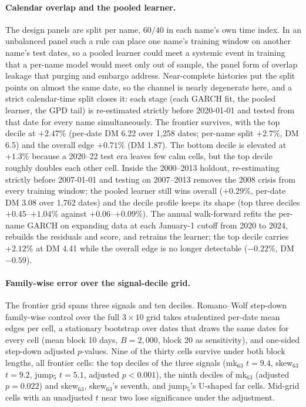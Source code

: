 \documentclass[11pt]{article}
\begin{document}
\paragraph{Calendar overlap and the pooled learner.} The design panels are split per name, $60/40$ in each name's own time index. In an unbalanced panel such a rule can place one name's training window on another name's test dates, so a pooled learner could meet a systemic event in training that a per-name model would meet only out of sample, the panel form of overlap leakage that purging and embargo address. Near-complete histories put the split points on almost the same date, so the channel is nearly degenerate here, and a strict calendar-time split closes it: each stage (each GARCH fit, the pooled learner, the GPD tail) is re-estimated strictly before 2020-01-01 and tested from that date for every name simultaneously. The frontier survives, with the top decile at $+2.47\%$ (per-date DM 6.22 over 1{,}258 dates; per-name split $+2.7\%$, DM 6.5) and the overall edge $+0.71\%$ (DM 1.87). The bottom decile is elevated at $+1.3\%$ because a 2020--22 test era leaves few calm cells, but the top decile roughly doubles each other cell. Inside the 2000--2013 holdout, re-estimating strictly before 2007-01-01 and testing on 2007--2013 removes the 2008 crisis from every training window; the pooled learner still wins overall ($+0.29\%$, per-date DM 3.08 over 1{,}762 dates) and the decile profile keeps its shape (top three deciles $+0.45$--$+1.04\%$ against $+0.06$--$+0.09\%$). The annual walk-forward refits the per-name GARCH on expanding data at each January-1 cutoff from 2020 to 2024, rebuilds the residuals and score, and retrains the learner; the top decile carries $+2.12\%$ at DM 4.41 while the overall edge is no longer detectable ($-0.22\%$, DM $-0.59$).

\paragraph{Family-wise error over the signal-decile grid.} The frontier grid spans three signals and ten deciles. Romano--Wolf step-down family-wise control over the full $3\times10$ grid takes studentized per-date mean edges per cell, a stationary bootstrap over dates that draws the same dates for every cell (mean block 10 days, $B=2{,}000$, block 20 as sensitivity), and one-sided step-down adjusted $p$-values. Nine of the thirty cells survive under both block lengths, all frontier cells: the top deciles of the three signals (mk$_{63}$ $t=9.4$, skew$_{63}$ $t=9.2$, jump$_5$ $t=5.1$, adjusted $p<0.001$), the ninth deciles of mk$_{63}$ (adjusted $p=0.022$) and skew$_{63}$, skew$_{63}$'s seventh, and jump$_5$'s U-shaped far cells. Mid-grid cells with an unadjusted $t$ near two lose significance under the adjustment.
\end{document}
